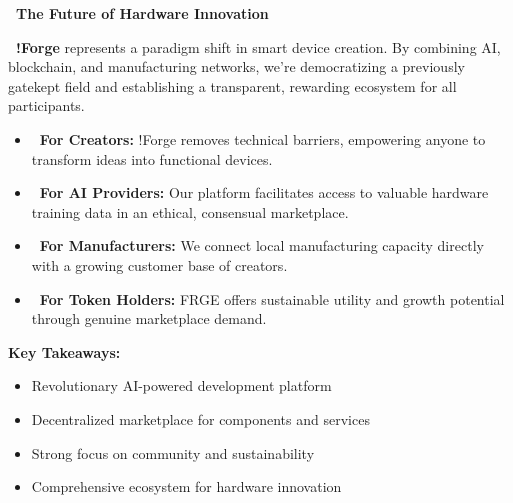 \begin{center}
\large{\textcolor{fabPrimary}{\textbf{\faLightbulbO\ The Future of Hardware Innovation}}}
\end{center}

\vspace{0.5em}

\textbf{\textcolor{fabPrimary}{\faGears\ !Forge}} represents a paradigm shift in smart device creation. By combining AI, blockchain, and manufacturing networks, we're democratizing a previously gatekept field and establishing a transparent, rewarding ecosystem for all participants.

\vspace{0.5em}

\begin{itemize}[leftmargin=*]
    \item \textbf{\textcolor{fabPrimary}{\faUsers\ For Creators:}} !Forge removes technical barriers, empowering anyone to transform ideas into functional devices.
    
    \item \textbf{\textcolor{fabPrimary}{\faCog\ For AI Providers:}} Our platform facilitates access to valuable hardware training data in an ethical, consensual marketplace.
    
    \item \textbf{\textcolor{fabPrimary}{\faIndustry\ For Manufacturers:}} We connect local manufacturing capacity directly with a growing customer base of creators.
    
    \item \textbf{\textcolor{fabPrimary}{\faBitcoin\ For Token Holders:}} FRGE offers sustainable utility and growth potential through genuine marketplace demand.
\end{itemize}

\vspace{0.5em}

\begin{center}
\end{center}

\vspace{0.5cm}
\noindent\textbf{Key Takeaways:}
\begin{itemize}[leftmargin=*]
    \item Revolutionary AI-powered development platform
    \item Decentralized marketplace for components and services
    \item Strong focus on community and sustainability
    \item Comprehensive ecosystem for hardware innovation
\end{itemize}